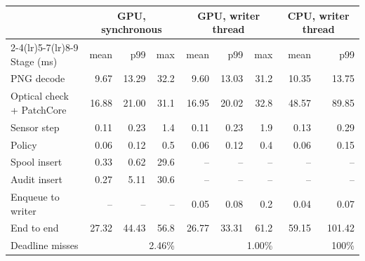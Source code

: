 \begin{tabular}{@{}lrrrrrrrr@{}}
\toprule
 & \multicolumn{3}{c}{GPU, synchronous} & \multicolumn{3}{c}{GPU, writer thread} & \multicolumn{2}{c}{CPU, writer thread} \\
\cmidrule(lr){2-4}\cmidrule(lr){5-7}\cmidrule(lr){8-9}
Stage (ms) & mean & p99 & max & mean & p99 & max & mean & p99 \\
\midrule
PNG decode & 9.67 & 13.29 & 32.2 & 9.60 & 13.03 & 31.2 & 10.35 & 13.75 \\
Optical check + PatchCore & 16.88 & 21.00 & 31.1 & 16.95 & 20.02 & 32.8 & 48.57 & 89.85 \\
Sensor step & 0.11 & 0.23 & 1.4 & 0.11 & 0.23 & 1.9 & 0.13 & 0.29 \\
Policy & 0.06 & 0.12 & 0.5 & 0.06 & 0.12 & 0.4 & 0.06 & 0.15 \\
Spool insert & 0.33 & 0.62 & 29.6 & -- & -- & -- & -- & -- \\
Audit insert & 0.27 & 5.11 & 30.6 & -- & -- & -- & -- & -- \\
Enqueue to writer & -- & -- & -- & 0.05 & 0.08 & 0.2 & 0.04 & 0.07 \\
\midrule
End to end & 27.32 & 44.43 & 56.8 & 26.77 & 33.31 & 61.2 & 59.15 & 101.42 \\
Deadline misses & \multicolumn{3}{r}{2.46\%} & \multicolumn{3}{r}{1.00\%} & \multicolumn{2}{r}{100\%} \\
\bottomrule
\end{tabular}
